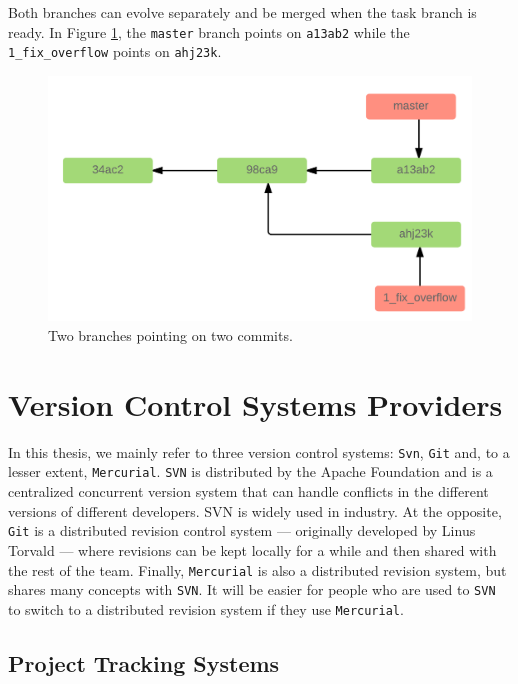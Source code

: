 \documentclass[12pt]{report}
\begin{document}
Both branches can evolve separately and be merged when the task branch
is ready. In Figure \ref{fig:merge}, the \lstinline!master! branch
points on \lstinline!a13ab2! while the \lstinline!1_fix_overflow! points
on \lstinline!ahj23k!.

\begin{figure}[h!]
  \centering
    \includegraphics[scale=0.25]{media/merge.png}
    \caption{Two branches pointing on two commits.
    \label{fig:merge}}
\end{figure}

\section{\texorpdfstring{Version Control Systems
Providers\label{sec:revision-provider}}{Version Control Systems Providers}}\label{version-control-systems-providers}

In this thesis, we mainly refer to three version control systems:
\lstinline!Svn!, \lstinline!Git! and, to a lesser extent,
\lstinline!Mercurial!. \lstinline!SVN! is distributed by the Apache
Foundation and is a centralized concurrent version system that can
handle conflicts in the different versions of different developers. SVN
is widely used in industry. At the opposite, \lstinline!Git! is a
distributed revision control system --- originally developed by Linus
Torvald --- where revisions can be kept locally for a while and then
shared with the rest of the team. Finally, \lstinline!Mercurial! is also
a distributed revision system, but shares many concepts with
\lstinline!SVN!. It will be easier for people who are used to
\lstinline!SVN! to switch to a distributed revision system if they use
\lstinline!Mercurial!.

\subsection{Project Tracking Systems\label{sec:issue-tracking}}
\end{document}
